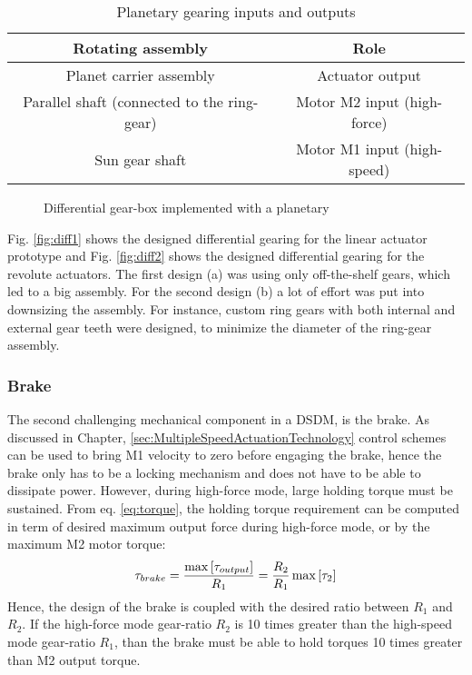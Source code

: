 \begin{table}[htbp]
	\centering
		\begin{tabular}{ c c }
			\hline
			Rotating assembly & Role \\
			\hline \hline
			Planet carrier assembly & Actuator output \\
			Parallel shaft (connected to the ring-gear) & Motor M2 input (high-force) \\
			Sun gear shaft          & Motor M1 input (high-speed) \\
			\hline
		\end{tabular}
	\caption{Planetary gearing inputs and outputs}
	\label{tab:PlanetaryGearingInputsAndOutput}
\end{table}

\begin{figure}[htp]
        \centering
				\hspace{+5pt}
        \caption{Differential gear-box implemented with a planetary}
				\label{fig:differnentials}
\end{figure}

Fig. \ref{fig:diff1} shows the designed differential gearing for the linear actuator prototype and Fig. \ref{fig:diff2} shows the designed differential gearing for the revolute actuators. The first design (a) was using only off-the-shelf gears, which led to a big assembly. For the second design (b) a lot of effort was put into downsizing the assembly. For instance, custom ring gears with both internal and external gear teeth were designed, to minimize the diameter of the ring-gear assembly.

\subsubsection{Brake}

The second challenging mechanical component in a DSDM, is the brake. As discussed in Chapter, \ref{sec:MultipleSpeedActuationTechnology} control schemes can be used to bring M1 velocity to zero before engaging the brake, hence the brake only has to be a locking mechanism and does not have to be able to dissipate power. However, during high-force mode, large holding torque must be sustained. From eq. \eqref{eq:torque}, the holding torque requirement can be computed in term of desired maximum output force during high-force mode, or by the maximum M2 motor torque: 
%
\begin{align}
	\tau_{brake} = \frac{ \operatornamewithlimits{max} \left[ \tau_{output} \right] }{R_1} = \frac{ R_2 }{ R_1 } \operatornamewithlimits{max} \left[  \tau_2 \right]
	\label{eq:brakelim}
\end{align}
%
Hence, the design of the brake is coupled with the desired ratio between $R_1$ and $R_2$. If the high-force mode gear-ratio $R_2$ is 10 times greater than the high-speed mode gear-ratio $R_1$, than the brake must be able to hold torques 10 times greater than M2 output torque. 

